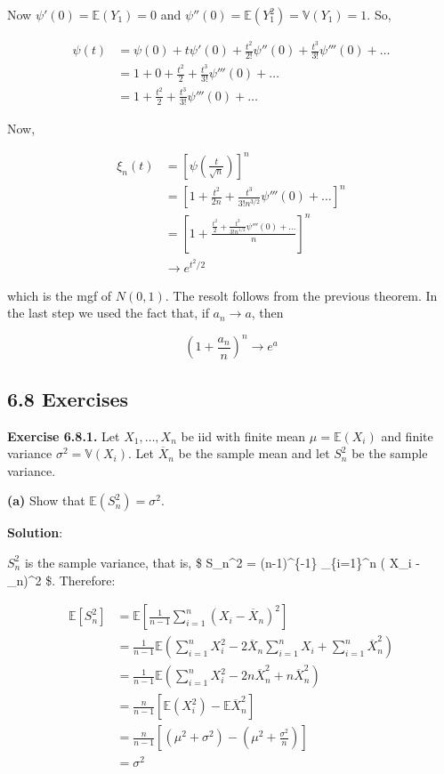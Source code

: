 Now \(\psi'(0) = \mathbb{E}(Y_1) = 0\) and
\(\psi''(0) = \mathbb{E}(Y_1^2) = \mathbb{V}(Y_1) = 1\). So,

\begin{align}
\psi(t) & = \psi(0) + t \psi'(0) + \frac{t^2}{2!} \psi''(0) + \frac{t^3}{3!} \psi'''(0) + \dots \\
        & = 1 + 0 + \frac{t^2}{2} +  \frac{t^3}{3!} \psi'''(0) + \ldots \\
        & = 1 + \frac{t^2}{2} +  \frac{t^3}{3!} \psi'''(0) + \ldots
\end{align}

Now,

\begin{align}
\xi_n(t) & = \left[ \psi \left( \frac{t}{\sqrt{n}} \right) \right] ^n \\
         & = \left[  1 + \frac{t^2}{2n} +  \frac{t^3}{3!n^{3/2}} \psi'''(0) + \ldots \right] ^n \\
         & = \left[  1 + \frac{\frac{t^2}{2} +  \frac{t^3}{3!n^{1/2}} \psi'''(0) + \ldots}{n} \right] ^n \\
         & \rightarrow e^{t^2/2}
\end{align}

which is the mgf of \(N(0, 1)\). The resolt follows from the previous
theorem. In the last step we used the fact that, if
\(a_n \rightarrow a\), then

\[ \left( 1 + \frac{a_n}{n} \right) ^n \rightarrow e^a \]

\subsection{6.8 Exercises}\label{exercises}

\textbf{Exercise 6.8.1.} Let \(X_1, \dots, X_n\) be iid with finite mean
\(\mu = \mathbb{E}(X_i)\) and finite variance
\(\sigma^2 = \mathbb{V}(X_i)\). Let \(\overline{X}_n\) be the sample
mean and let \(S_n^2\) be the sample variance.

\textbf{(a)} Show that \(\mathbb{E}(S_n^2) = \sigma^2\).

\textbf{Solution}:

\(S_n^2\) is the sample variance, that is, \$ S\_n\^{}2 =
(n-1)\^{}\{-1\} \sum\_\{i=1\}\^{}n ( X\_i - \_n)\^{}2 \$.
Therefore:

\begin{align}
\mathbb{E}[S_n^2] & = \mathbb{E}\left[ \frac {1}{n-1} \sum_{i=1}^n \left(X_i - \overline{X}_n \right)^2 \right] \\
& = \frac {1}{n-1} \mathbb{E} \left( \sum_{i=1}^n X_i^2 - 2 \overline{X}_n \sum_{i=1}^n X_i + \sum_{i=1}^n \overline{X}_n^2 \right) \\
& = \frac {1}{n-1} \mathbb{E} \left( \sum_{i=1}^n X_i^2 - 2 n \overline{X}_n^2 + n \overline{X}_n^2 \right) \\
& = \frac {n}{n-1} \left[ \mathbb{E} (X_i^2) - \mathbb{E} \overline{X}_n^2 \right] \\
& = \frac {n}{n-1} \left[ \left( \mu^2+\sigma^2 \right) - \left( \mu^2 + \frac {\sigma^2}{n} \right) \right] \\
& = \sigma^2
\end{align}

